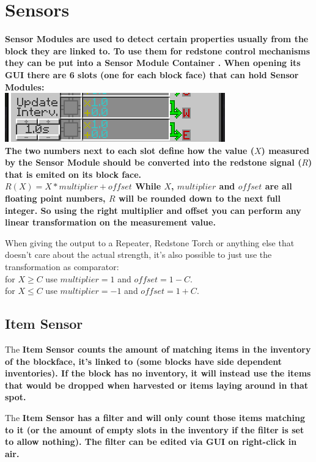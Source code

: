 \documentclass[11pt]{article} %
\begin{document}
\section{Sensors}
\bf Sensor Modules \rm are used to detect certain properties usually from the block they are linked to. To use them for redstone control mechanisms they can be put into a \bf Sensor Module Container \rm. When opening its GUI there are 6 slots (one for each block face) that can hold Sensor Modules:\\
\includegraphics[width = \textwidth]{sensor_gui}\\
The two numbers next to each slot define how the value ($X$) measured by the Sensor Module should be converted into the redstone signal ($R$) that is emited on its block face.\\
$R(X) = X*multiplier+offset$ While $X$, $multiplier$ and $offset$ are all floating point numbers, $R$ will be rounded down to the next full integer. So using the right multiplier and offset you can perform any linear transformation on the measurement value.

When giving the output to a Repeater, Redstone Torch or anything else that doesn't care about the actual strength, it's also possible to just use the transformation as comparator:\\
for $X\geq C$ use $multiplier=1$ and $offset=1-C$.\\
for $X\leq C$ use $multiplier=-1$ and $offset=1+C$.\\

\subsection{Item Sensor}
The \bf Item Sensor \rm counts the amount of matching items in the inventory of the blockface, it's linked to (some blocks have side dependent inventories). If the block has no inventory, it will instead use the items that would be dropped when harvested or items laying around in that spot.

The \bf Item Sensor \rm has a filter and will only count those items matching to it (or the amount of empty slots in the inventory if the filter is set to allow nothing). The filter can be edited via GUI on right-click in air.
\end{document}
